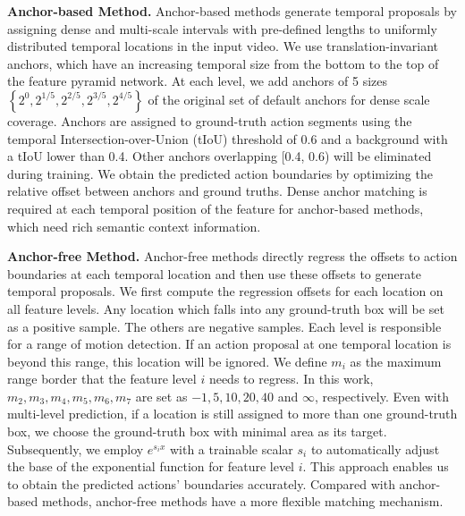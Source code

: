 \documentclass[a4paper,fleqn]{cas-dc}
\begin{document}
\textbf{Anchor-based Method.}
Anchor-based methods generate temporal proposals by assigning dense and multi-scale intervals with pre-defined lengths to uniformly distributed temporal locations in the input video.
We use translation-invariant anchors, which have an increasing temporal size from the bottom to the top of the feature pyramid network.
At each level, we add anchors of 5 sizes 
$\left\{2^{0},2^{1/5},2^{2/5},2^{3/5},2^{4/5} \right\}$ of the original set of default anchors for dense scale coverage.
Anchors are assigned to ground-truth action segments using the temporal Intersection-over-Union (tIoU) threshold of 0.6 and a background with a tIoU lower than 0.4.
Other anchors overlapping [0.4, 0.6) will be eliminated during training. We obtain the predicted action boundaries by optimizing the relative offset between anchors and ground truths. Dense anchor matching is required at each temporal position of the feature for anchor-based methods, which need rich semantic context information.

\textbf{Anchor-free Method.}
Anchor-free methods directly regress the offsets to action boundaries at each temporal location and then use these offsets to generate temporal proposals. We first compute the regression offsets for each location on all feature levels.
Any location which falls into any ground-truth box will be set as a positive sample. The others are negative samples.
Each level is responsible for a range of motion detection.
If an action proposal at one temporal location is beyond this range, this location will be ignored. We define $m_i$ as the maximum range border that the feature level $i$ needs to regress. In this work, $m_2, m_3, m_4, m_5, m_6, m_7$ are set as $-1, 5, 10, 20, 40$ and $\infty$, respectively. Even with multi-level prediction, if a location is still assigned to more than one ground-truth box, we choose the ground-truth box with minimal area as its target. Subsequently, we employ $e^{s_ix}$ with a trainable scalar $s_i$ to automatically adjust the base of the exponential function for feature level $i$. This approach enables us to obtain the predicted actions' boundaries accurately. Compared with anchor-based methods, anchor-free methods have a more flexible matching mechanism. 
\end{document}
